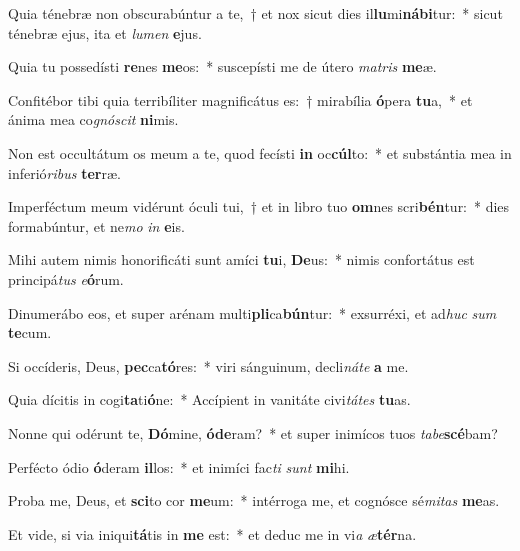 \item Quia ténebræ non obscurabúntur a te,~† et nox sicut dies il\textbf{lu}mi\textbf{ná}\textbf{bi}tur:~* sicut ténebræ ejus, ita et \textit{lu}\textit{men} \textbf{e}jus.
\item Quia tu possedísti \textbf{re}nes \textbf{me}os:~* suscepísti me de útero \textit{ma}\textit{tris} \textbf{me}æ.
\item Confitébor tibi quia terribíliter magnificátus es:~† mirabília \textbf{ó}pera \textbf{tu}a,~* et ánima mea co\textit{gnó}\textit{scit} \textbf{ni}mis.
\item Non est occultátum os meum a te, quod fecísti \textbf{in} oc\textbf{cúl}to:~* et substántia mea in inferió\textit{ri}\textit{bus} \textbf{ter}ræ.
\item Imperféctum meum vidérunt óculi tui,~† et in libro tuo \textbf{om}nes scri\textbf{bén}tur:~* dies formabúntur, et ne\textit{mo} \textit{in} \textbf{e}is.
\item Mihi autem nimis honorificáti sunt amíci \textbf{tu}i, \textbf{De}us:~* nimis confortátus est principá\textit{tus} \textit{e}\textbf{ó}rum.
\item Dinumerábo eos, et super arénam multi\textbf{pli}ca\textbf{bún}tur:~* exsurréxi, et ad\textit{huc} \textit{sum} \textbf{te}cum.
\item Si occíderis, Deus, \textbf{pec}ca\textbf{tó}res:~* viri sánguinum, decli\textit{ná}\textit{te} \textbf{a} me.
\item Quia dícitis in cogi\textbf{ta}ti\textbf{ó}ne:~* Accípient in vanitáte civi\textit{tá}\textit{tes} \textbf{tu}as.
\item Nonne qui odérunt te, \textbf{Dó}mine, \textbf{ó}\textbf{de}ram?~* et super inimícos tuos \textit{ta}\textit{be}\textbf{scé}bam?
\item Perfécto ódio \textbf{ó}deram \textbf{il}los:~* et inimíci fac\textit{ti} \textit{sunt} \textbf{mi}hi.
\item Proba me, Deus, et \textbf{sci}to cor \textbf{me}um:~* intérroga me, et cognósce sé\textit{mi}\textit{tas} \textbf{me}as.
\item Et vide, si via iniqui\textbf{tá}tis in \textbf{me} est:~* et deduc me in vi\textit{a} \textit{æ}\textbf{tér}na.

